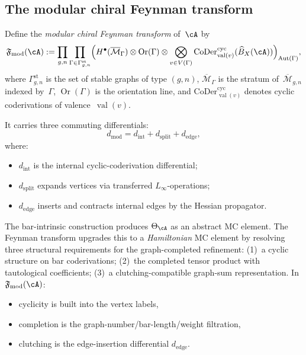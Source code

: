 \subsection{The modular chiral Feynman transform}
\label{subsec:nms-modular-feynman-transform}

\begin{definition}
\label{def:nms-modular-feynman-transform}
%
Define the \emph{modular chiral Feynman transform} of~$\cA$ by
\begin{equation}
\label{eq:nms-feynman-transform}
\mathfrak F_{\mathrm{mod}}(\cA)
:=
\prod_{g,n}\prod_{\Gamma\in \Gamma^{\mathrm{st}}_{g,n}}
\Bigl(
H^\bullet(\overline{\mathcal M}_\Gamma)
\otimes
\operatorname{Or}(\Gamma)
\otimes
\bigotimes_{v\in V(\Gamma)} \mathrm{CoDer}^{\mathrm{cyc}}_{\operatorname{val}(v)}(\widehat B_X(\cA))
\Bigr)_{\operatorname{Aut}(\Gamma)},
\end{equation}
where $\Gamma^{\mathrm{st}}_{g,n}$ is the set of stable graphs of type $(g,n)$, $\overline{\mathcal M}_\Gamma$ is the stratum of~$\overline{\mathcal M}_{g,n}$ indexed by~$\Gamma$, $\operatorname{Or}(\Gamma)$ is the orientation line, and $\mathrm{CoDer}^{\mathrm{cyc}}_{\operatorname{val}(v)}$ denotes cyclic coderivations of valence~$\operatorname{val}(v)$.

It carries three commuting differentials:
\[
d_{\mathrm{mod}}=d_{\mathrm{int}}+d_{\mathrm{split}}+d_{\mathrm{edge}},
\]
where:
\begin{itemize}
\item $d_{\mathrm{int}}$ is the internal cyclic-coderivation differential;
\item $d_{\mathrm{split}}$ expands vertices via transferred $L_\infty$-operations;
\item $d_{\mathrm{edge}}$ inserts and contracts internal edges by the Hessian propagator.
\end{itemize}
\end{definition}

\begin{remark}
\label{rem:nms-feynman-three-requirements}
The bar-intrinsic construction produces $\Theta_\cA$ as an abstract MC element. The Feynman transform upgrades this to a \emph{Hamiltonian} MC element by resolving three structural requirements for the graph-completed refinement: (1)~a cyclic structure on bar coderivations; (2)~the completed tensor product with tautological coefficients; (3)~a clutching-compatible graph-sum representation. In $\mathfrak F_{\mathrm{mod}}(\cA)$:
\begin{itemize}
\item cyclicity is built into the vertex labels,
\item completion is the graph-number/bar-length/weight filtration,
\item clutching is the edge-insertion differential $d_{\mathrm{edge}}$.
\end{itemize}
\end{remark}

